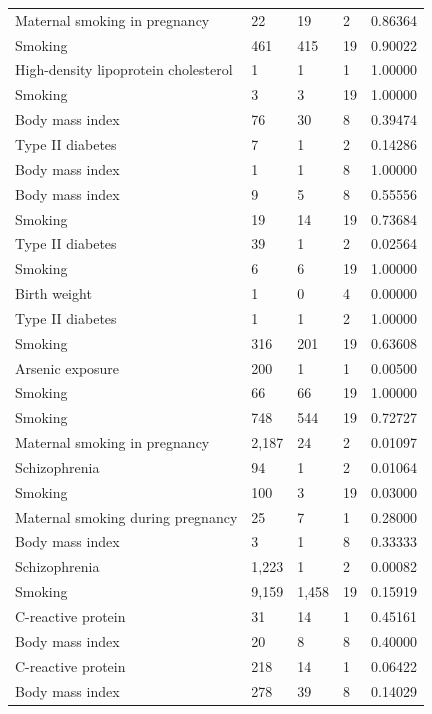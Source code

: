 \documentclass[11pt,oneside]{bristolthesis}
\begin{document}
\begin{table}
{\begin{tabular}[t]{lllll}
\addlinespace
\rowcolor{gray!6}  Maternal smoking in pregnancy & 22 & 19 & 2 & 0.86364\\
Smoking & 461 & 415 & 19 & 0.90022\\
\rowcolor{gray!6}  High-density lipoprotein cholesterol & 1 & 1 & 1 & 1.00000\\
Smoking & 3 & 3 & 19 & 1.00000\\
\rowcolor{gray!6}  Body mass index & 76 & 30 & 8 & 0.39474\\
\addlinespace
Type II diabetes & 7 & 1 & 2 & 0.14286\\
\rowcolor{gray!6}  Body mass index & 1 & 1 & 8 & 1.00000\\
Body mass index & 9 & 5 & 8 & 0.55556\\
\rowcolor{gray!6}  Smoking & 19 & 14 & 19 & 0.73684\\
Type II diabetes & 39 & 1 & 2 & 0.02564\\
\addlinespace
\rowcolor{gray!6}  Smoking & 6 & 6 & 19 & 1.00000\\
Birth weight & 1 & 0 & 4 & 0.00000\\
\rowcolor{gray!6}  Type II diabetes & 1 & 1 & 2 & 1.00000\\
Smoking & 316 & 201 & 19 & 0.63608\\
\rowcolor{gray!6}  Arsenic exposure & 200 & 1 & 1 & 0.00500\\
\addlinespace
Smoking & 66 & 66 & 19 & 1.00000\\
\rowcolor{gray!6}  Smoking & 748 & 544 & 19 & 0.72727\\
Maternal smoking in pregnancy & 2,187 & 24 & 2 & 0.01097\\
\rowcolor{gray!6}  Schizophrenia & 94 & 1 & 2 & 0.01064\\
Smoking & 100 & 3 & 19 & 0.03000\\
\addlinespace
\rowcolor{gray!6}  Maternal smoking during pregnancy & 25 & 7 & 1 & 0.28000\\
Body mass index & 3 & 1 & 8 & 0.33333\\
\rowcolor{gray!6}  Schizophrenia & 1,223 & 1 & 2 & 0.00082\\
Smoking & 9,159 & 1,458 & 19 & 0.15919\\
\rowcolor{gray!6}  C-reactive protein & 31 & 14 & 1 & 0.45161\\
\addlinespace
Body mass index & 20 & 8 & 8 & 0.40000\\
\rowcolor{gray!6}  C-reactive protein & 218 & 14 & 1 & 0.06422\\
Body mass index & 278 & 39 & 8 & 0.14029\\

\end{tabular}}
\end{table}
\end{document}
